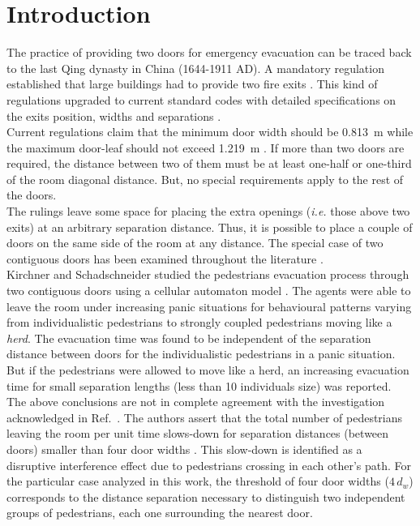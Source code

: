 \section{\label{introduction}Introduction}

The practice of providing two doors for emergency evacuation can be traced back 
to the last Qing dynasty in China (1644-1911 AD). A mandatory regulation 
established that large buildings had to provide two fire exits \cite{cheng}. 
This kind of regulations upgraded to current standard codes with detailed  
specifications on the exits position, widths and separations \cite{OSHA,FLO}. \\


Current regulations claim that the minimum door width should be 0.813~m while 
the maximum door-leaf should not exceed 1.219~m \cite{FLO,FLO2}. If more than 
two doors are required, the distance between two of them must be at least 
one-half or one-third of the room diagonal distance. But, no special 
requirements apply to the rest of the doors.  \\

The rulings leave some space for placing the extra openings (\emph{i.e.} those 
above two exits) at an arbitrary separation distance. Thus, it is possible to 
place a couple of doors on the same side of the room at any distance. The 
special case of two contiguous doors has been examined throughout the 
literature \cite{kirchner1,perez1,daoliang1,huanhuan1}.  \\

Kirchner and Schadschneider studied the pedestrians evacuation process through 
two contiguous doors using a cellular automaton model \cite{kirchner1}. The 
agents were able to leave the room under increasing panic situations for 
behavioural patterns varying from individualistic pedestrians to strongly 
coupled pedestrians moving like a \emph{herd}. The evacuation time was found 
to be independent of the separation distance between doors for the 
individualistic pedestrians in a panic situation. But if the pedestrians were 
allowed to move like a herd, an increasing evacuation time for small separation 
lengths (less than 10 individuals size) was reported. \\

The above conclusions are not in complete agreement with the investigation 
acknowledged in Ref.~\cite{perez1}. The authors assert that the total number of 
pedestrians leaving the room per unit time slows-down for separation 
distances (between doors) smaller than four door widths \cite{perez1}. This 
slow-down is identified as a disruptive interference effect due to pedestrians 
crossing in each other's path.  For the particular case analyzed in this work,  
the threshold of four door widths ($4\,d_w$) corresponds to the distance 
separation necessary to distinguish two independent groups of pedestrians, each 
one surrounding the nearest door. \\

